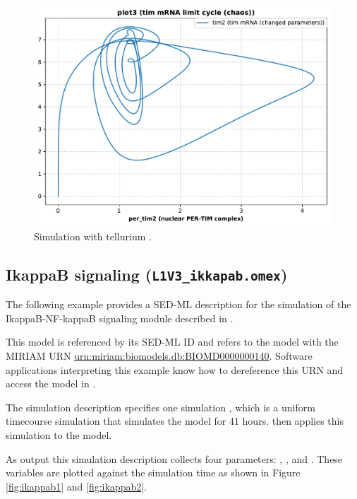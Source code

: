 \begin{figure}[ht]
\begin{minipage}{0.47\textwidth}
		\includegraphics[width=1.0\textwidth]{examples/leloup-sbml/results/tellurium/plot3}
        \caption{Simulation with tellurium \citep{tellurium}.}
        \label{fig:leloup-sbml2}
    \end{minipage}
    
\end{figure}



\subsection{IkappaB signaling (\texttt{L1V3\_ikkapab.omex})}
The following example provides a SED-ML description for the simulation of the IkappaB-NF-kappaB signaling module described in \citep{hoffmann2002ikappab}.

This model is referenced by its SED-ML ID  and refers to the model with the MIRIAM URN \url{urn:miriam:biomodels.db:BIOMD0000000140}. 
Software applications interpreting this example know how to dereference this URN and access the model in \biom \citep{N+06}.

The simulation description specifies one simulation , which is a uniform timecourse simulation that simulates the model for 41 hours.  then applies this simulation to the model.

As output this simulation description collects four parameters: , ,  and . These variables are plotted against the simulation time as shown in Figure \ref{fig:ikappab1} and \ref{fig:ikappab2}.

